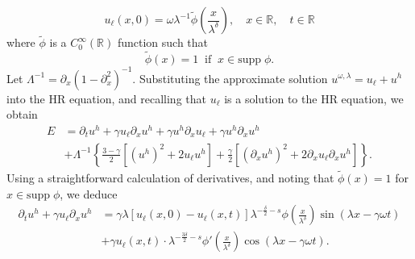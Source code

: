 \documentclass[12pt,reqno]{amsart}
\newcommand{\rr}{\mathbb{R}}
\newcommand{\p}{\partial}
\theoremstyle{plain}  %
\theoremstyle{definition}
\begin{document}
\begin{equation}
	u_\ell(x,0) = \omega \lambda^{-1} \tilde{\phi} \left(
	\frac{x}{\lambda^{\delta}}
	\right), \quad x \in \rr, \quad t \in \rr
	\label{apple1**}
\end{equation}
where $\tilde{\phi}$ is a $C^{\infty}_0(\rr)$ function such that
\begin{equation}
	\label{apple1***}
	\tilde{\phi}(x) = 1 \; \;  \text{if} \; \;
	x \in \text{supp} \; \phi.
\end{equation}
Let $\Lambda^{-1} = \p_x (1 - \p_x^2)^{-1} $. Substituting the
approximate solution $u^{\omega, \lambda} = u_\ell + u^h$ into the HR
equation, and recalling that $u_\ell$ is a solution to the
HR equation, we obtain
\begin{equation}
	\begin{split}
		E 
		& = \p_t u^h + \gamma u_\ell \p_x u^h + \gamma u^h \p_x u_\ell +
		\gamma u^h \p_x u^h
		\\
		& + \Lambda^{-1} \left\{ \frac{3-\gamma}{2}\left[ \left( u^h
		\right)^2 + 2u_\ell u^h
		\right]+ \frac{\gamma}{2}\left[ \left( \p_x u^h \right)^2 + 2
		\p_x u_\ell \p_x u^h\right] \right\}.
		\label{apple2star}
	\end{split}
\end{equation}
Using a straightforward calculation of derivatives, and
noting that $\tilde{\phi} (x) = 1$ for $x \in \text{supp} \;
\phi$,
we deduce
\begin{equation}
	\begin{split}
		\p_t u^h + \gamma u_\ell \p_x u^h 
		& = \gamma \lambda\left[ u_\ell(x,0) - u_\ell(x,t)
		\right]\lambda^{-\frac{\delta}{2}-s} \phi\left(
		\frac{x}{\lambda^\delta}
		\right) \sin(\lambda x - \gamma \omega t)
		\\
		& + \gamma u_\ell(x,t) \cdot \lambda^{-\frac{3\delta}{2}-s}
		\phi'\left( \frac{x}{\lambda^\delta} \right)\cos\left( \lambda
		x - \gamma \omega t
		\right).
						 \label{apple5}
					 \end{split}
				 \end{equation}
\end{document}
